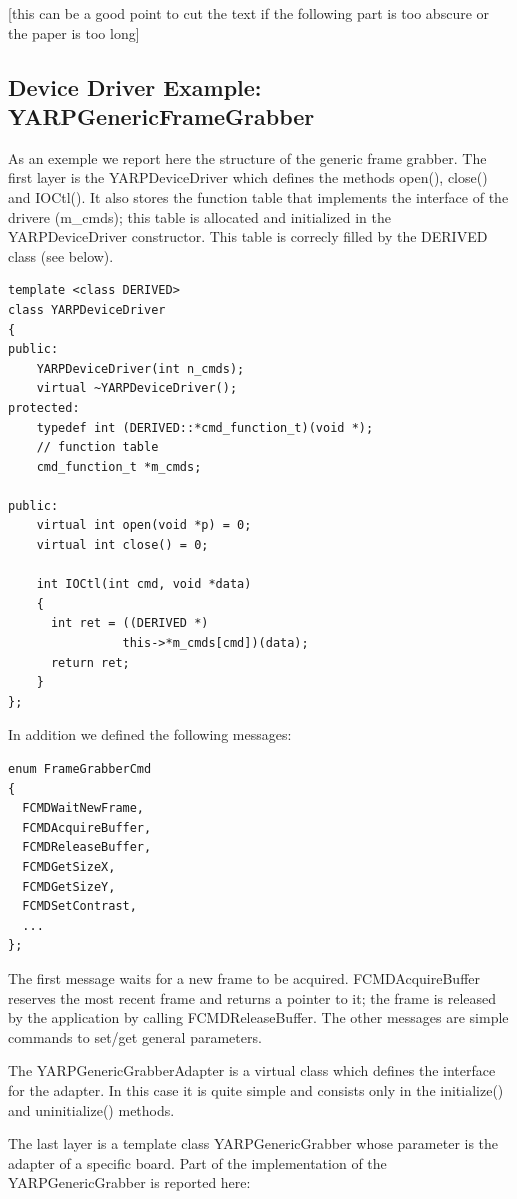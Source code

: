 [this can be a good point to cut the text if the following part is too abscure or the paper is too long]

\subsection{Device Driver Example: YARPGenericFrameGrabber}

As an exemple we report here the structure of the generic frame grabber. The first layer is the YARPDeviceDriver which defines the methods open(), close() and IOCtl(). It also stores the function table that implements the interface of the drivere (m\_cmds); this table is allocated and initialized in the YARPDeviceDriver constructor. This table is correcly filled by the DERIVED class (see below).

{\small \begin{verbatim}
template <class DERIVED>
class YARPDeviceDriver
{
public:
	YARPDeviceDriver(int n_cmds);
	virtual ~YARPDeviceDriver();
protected:
	typedef int (DERIVED::*cmd_function_t)(void *);
	// function table
	cmd_function_t *m_cmds;

public:
	virtual int open(void *p) = 0;
	virtual int close() = 0;

	int IOCtl(int cmd, void *data)
	{
	  int ret = ((DERIVED *)
	            this->*m_cmds[cmd])(data);
	  return ret;
	}
};
\end{verbatim} }

In addition we defined the following messages:

{\small \begin{verbatim}
enum FrameGrabberCmd
{
  FCMDWaitNewFrame,
  FCMDAcquireBuffer,
  FCMDReleaseBuffer,
  FCMDGetSizeX,
  FCMDGetSizeY,
  FCMDSetContrast,
  ...
};
\end{verbatim} }

The first message waits for a new frame to be acquired. FCMDAcquireBuffer reserves the most recent frame and returns a pointer to it; the frame is released by the application by calling FCMDReleaseBuffer. The other messages are simple commands to set/get general parameters.

The YARPGenericGrabberAdapter is a virtual class which defines the interface for the adapter. In this case it is quite simple and consists only in the initialize() and uninitialize() methods. 

The last layer is a template class YARPGenericGrabber whose parameter is the adapter of a specific board. Part of the implementation of the YARPGenericGrabber is reported here:

